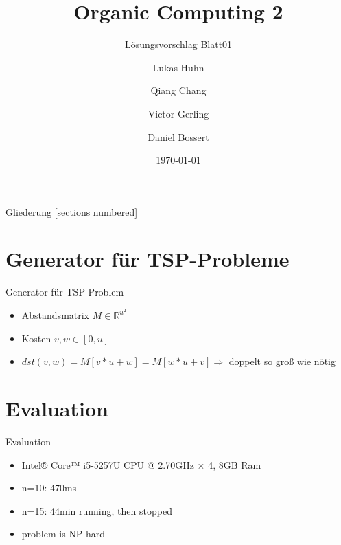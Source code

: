\documentclass{ocbeameruni}
\title{Organic Computing 2}
\subtitle{Lösungsvorschlag Blatt01}
\date{\today}
\author{Lukas Huhn \and Qiang Chang \and Victor Gerling \and Daniel Bossert}
\institute{%
  Universität Augsburg\\
  Institut für Informatik\\
  Lehrstuhl für Organic Computing
}
\newcommand{\R}{\mathbb{R}}
\begin{document}
\maketitle


\begin{frame}{Gliederung}
  [sections numbered]
  \tableofcontents
\end{frame}


\section{Generator für TSP-Probleme}

\begin{frame}{Generator für TSP-Problem}
    \begin{itemize}
    \item Abstandsmatrix $M \in {\R}^{u^{2}}$
    \item Kosten $v,w \in [0,u]$
    \item $dst(v,w) = M[v*u+w] = M[w*u+v] \Rightarrow$ 
    doppelt so groß wie nötig
    \end{itemize}
\end{frame}


\section{Evaluation}

\begin{frame}{Evaluation}
    \begin{itemize}
        \item Intel® Core™ i5-5257U CPU @ 2.70GHz × 4, 8GB Ram
        \item n=10: 470ms 
        \item n=15: 44min running, then stopped
        \item problem is NP-hard
    \end{itemize}
\end{frame}
\end{document}
